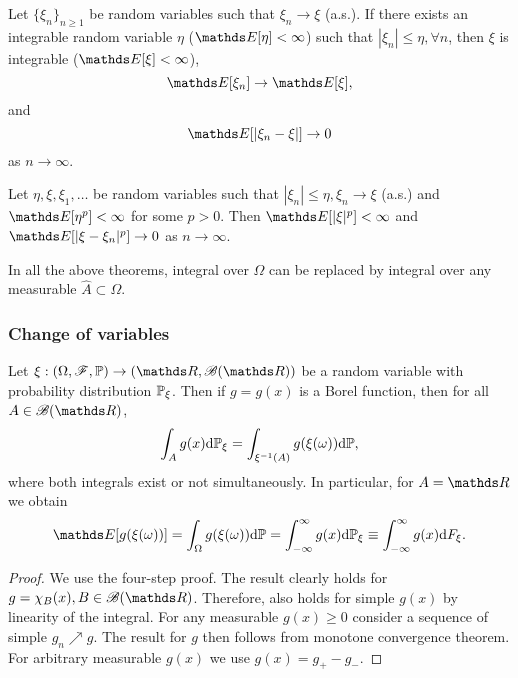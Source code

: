 \begin{theorem}
Let $\{\xi_n\}_{n\ge 1}$ be random variables such that $\xi_n \rightarrow \xi$ (a.s.). If there exists an integrable random variable $\eta$ ($\E[\eta] < \infty$) such that $|\xi_n|\le \eta, \forall n$, then $\xi$ is integrable ($\E[\xi] < \infty$),
\begin{equation}
    \E[\xi_n] \rightarrow \E[\xi],
\end{equation}
and 
\begin{equation}
    \E[|\xi_n - \xi|] \rightarrow 0
\end{equation}
as $n \rightarrow \infty$.
\end{theorem}
\begin{corollary}
Let $\eta, \xi, \xi_1, \dots$ be random variables such that $|\xi_n| \le \eta, \xi_n \rightarrow \xi$ (a.s.) and $\E[\eta^p] < \infty$ for some $p > 0$. Then $\E[|\xi|^p] < \infty$ and $\E[|\xi - \xi_n|^p] \rightarrow 0$ as $n \rightarrow \infty$.
\end{corollary}
\begin{remark}
In all the above theorems, integral over $\Omega$ can be replaced by integral over any measurable $\hat{A} \subset \Omega$.
\end{remark}

\subsubsection{Change of variables}
\begin{theorem} \label{thm:LOTUS}
Let $\xi: (\Omega, \F, \p) \to (\R, \B(\R))$ be a random variable with probability distribution $\mathbb{P}_\xi$. Then if $g = g(x)$ is a Borel function, then for all $A \in \B(\R)$,
\begin{equation}
    \int_A g(x) \mathrm{d}\mathbb{P}_\xi = \int_{\xi^{-1}(A)}g(\xi(\omega)) \mathrm{d}\mathbb{P},
\end{equation}
where both integrals exist or not simultaneously. In particular, for $A = \R$ we obtain
\begin{equation}
    \E [g(\xi(\omega))] = \int_\Omega g(\xi(\omega))\d\p = \int_{-\infty}^\infty g(x) \d\p_\xi \equiv \int_{-\infty}^\infty g(x) \d F_\xi.
\end{equation}
\end{theorem}
\begin{proof}
We use the four-step proof. The result clearly holds for $g = \chi_B(x), B \in \B(\R)$. Therefore, also holds for simple $g(x)$ by linearity of the integral. For any measurable $g(x) \ge 0$ consider a sequence of simple $g_n \nearrow g$. The result for $g$ then follows from monotone convergence theorem. For arbitrary measurable $g(x)$ we use $g(x) = g_+ - g_-.$
\end{proof}


